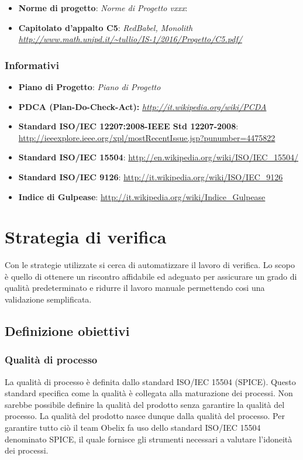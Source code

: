 \begin{itemize}
\item \textbf{Norme di progetto}:  \emph{Norme di Progetto vxxx}:
\item \textbf{Capitolato d'appalto C5}: \emph{RedBabel, Monolith \url{http://www.math.unipd.it/~tullio/IS-1/2016/Progetto/C5.pdf/}}

\end{itemize}

\subsubsection{Informativi}

\begin{itemize}
\item \textbf{Piano di Progetto}: \emph{Piano di Progetto}
\item \textbf{PDCA (Plan-Do-Check-Act): } \emph{\url{http://it.wikipedia.org/wiki/PCDA}}
\item \textbf{Standard ISO/IEC 12207:2008-IEEE Std 12207-2008}: \url{http://ieeexplore.ieee.org/xpl/mostRecentIssue.jsp?punumber=4475822}
\item \textbf{Standard ISO/IEC 15504}:  \url{http://en.wikipedia.org/wiki/ISO/IEC\_15504/}
\item \textbf{Standard ISO/IEC 9126}: \url{http://it.wikipedia.org/wiki/ISO/IEC\_9126}
\item \textbf{Indice di Gulpease}: \url{http://it.wikipedia.org/wiki/Indice\_Gulpease}
\end{itemize}



\section{Strategia di verifica}

Con le strategie utilizzate si cerca di automatizzare il lavoro di
verifica. Lo scopo è quello di ottenere un riscontro affidabile ed
adeguato per assicurare un grado di qualità predeterminato e ridurre
il lavoro manuale permettendo cosi una validazione semplificata. 


\subsection{Definizione obiettivi}


\subsubsection{Qualità di processo}
La qualità di processo è definita dallo standard ISO/IEC 15504 (SPICE). Questo standard specifica come la qualità è collegata alla maturazione dei processi.
Non sarebbe possibile definire la qualità del prodotto senza garantire
la qualità del processo. La qualità del prodotto nasce dunque dalla
qualità del processo. Per garantire tutto ciò il team Obelix fa uso
dello standard ISO/IEC 15504 denominato SPICE, il quale fornisce gli
strumenti necessari a valutare l'idoneità dei processi. 


